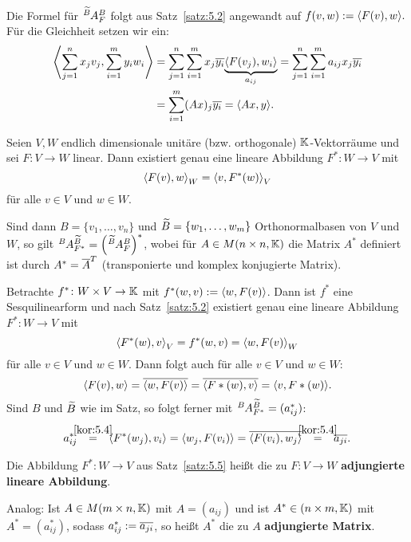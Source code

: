 \begin{beweis}
	Die Formel für $\mat{A}{\wt{B}}{B}{F}$ folgt aus Satz~\ref{satz:5.2} angewandt auf $f(v,w) := \sk{F(v),w}.$
	Für die Gleichheit setzen wir ein:
	\begin{align*}
		\sk{\sum_{j=1}^{n} x_j v_j, \sum_{i=1}^{m} y_i w_i} &= \sum_{j=1}^{n} \sum_{i=1}^{m} x_j \ol{y_i} \Underbrace{\sk{F(v_j),w_i}}{a_{ij}} = \sum_{j=1}^{n} \sum_{i=1}^{m} a_{ij} x_j \ol{y_i} \\
		&= \sum_{i=1}^{m} (Ax)_j \ol{y_i} = \sk{Ax,y}. 
	\end{align*}
\end{beweis}

\begin{satz}
	\label{satz:5.5}
	Seien $V,W$ endlich dimensionale unitäre (bzw. orthogonale) $\mathbb{K}$-Vektorräume und sei $F \colon V \rightarrow W$ linear.
	Dann existiert genau eine lineare Abbildung $F^* \colon W \rightarrow V$ mit
	\[
		\left\langle F(v),w\right\rangle_W = \left\langle v,F^*(w)\right\rangle_V
	\]
	für alle $v \in V$ und $w \in W$.
	
	Sind dann $B = \{v_1,\dots,v_n\}$ und $\widetilde{B} = \{w_1,\dots,w_m\}$ Orthonormalbasen von $V$ und $W$, so gilt $\mat{A}{B}{\wt{B}}{F^*} = \enb{\mat{A}{\wt{B}}{B}{F}}^*$, wobei für $A \in M(n \times n, \mathbb{K})$ die Matrix $A^*$ definiert ist durch $A^* = \overline{A}^T$ (transponierte und komplex konjugierte Matrix).
\end{satz}

\begin{beweis}
	Betrachte $f^*\colon W \times V \rightarrow \mathbb{K}$ mit $f^*(w,v) := \left\langle w,F(v)\right\rangle$.
	Dann ist $f^*$ eine Sesquilinearform und nach Satz~\ref{satz:5.2} existiert genau eine lineare Abbildung $F^*\colon W \rightarrow V$ mit
	\[
		\left\langle F^*(w),v\right\rangle_V = f^*(w,v) = \left\langle w,F(v)\right\rangle_W
	\]
	für alle $v \in V$ und $w \in W$.
	Dann folgt auch für alle $v \in V$ und $w \in W$:
	\[
		\sk{F(v),w} = \ol{\sk{w,F(v)}} = \ol{\sk{F*(w),v}} = \sk{v,F*(w)}.
	\]
	Sind $B$ und $\widetilde{B}$ wie im Satz, so folgt ferner mit $\mat{A}{B}{\wt{B}}{F^*} = (a^*_{ij})$:
	\[
		a^*_{ij} \stack{\ref{kor:5.4}}{=} \sk{F^*(w_j),v_i} = \sk{w_j,F(v_i)} = \ol{\sk{F(v_i),w_j}} \stack{\ref{kor:5.4}}{=} \ol{a_{ji}}. 
	\]
\end{beweis}

\begin{definition}[Adjungierte]
	\label{def:5.6}
	Die Abbildung $F^*\colon W \rightarrow V$ aus Satz~\ref{satz:5.5} heißt die zu $F \colon V \rightarrow W$ \textbf{adjungierte lineare Abbildung}.
	
	Analog: Ist $A \in M(m \times n, \mathbb{K})$ mit $A = (a_{ij})$ und ist $A^* \in (n \times m, \mathbb{K})$ mit $A^* = (a^*_{ij})$, sodass $a^*_{ij} := \overline{a_{ji}}$, so heißt $A^*$ die zu $A$ \textbf{adjungierte Matrix}. 
\end{definition}

